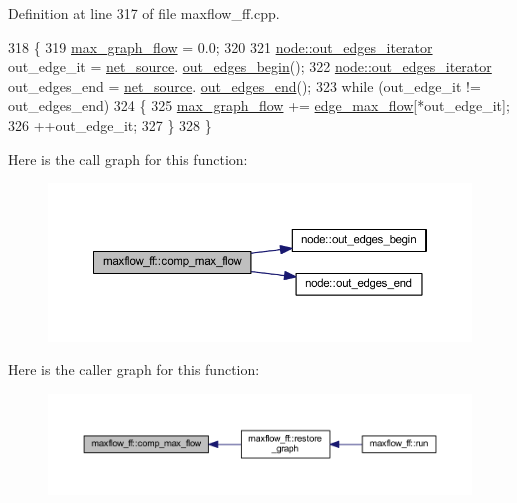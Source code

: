 Definition at line 317 of file maxflow\+\_\+ff.\+cpp.


\begin{DoxyCode}
318 \{
319     \mbox{\hyperlink{classmaxflow__ff_a7a2f530f9c95b6f37f4c349427a0f9bb}{max\_graph\_flow}} = 0.0;
320 
321     \mbox{\hyperlink{classnode_a90e17ed34de55072e8077f4367499a98}{node::out\_edges\_iterator}} out\_edge\_it = \mbox{\hyperlink{classmaxflow__ff_a2e4cc02ce8c9d929f2896525c686d6c1}{net\_source}}.
      \mbox{\hyperlink{classnode_a7dcb80df22118cea04f77ca8c952d9c2}{out\_edges\_begin}}();
322     \mbox{\hyperlink{classnode_a90e17ed34de55072e8077f4367499a98}{node::out\_edges\_iterator}} out\_edges\_end = \mbox{\hyperlink{classmaxflow__ff_a2e4cc02ce8c9d929f2896525c686d6c1}{net\_source}}.
      \mbox{\hyperlink{classnode_a7ce2ba5195a63d4df6b44299a02a9378}{out\_edges\_end}}();
323     \textcolor{keywordflow}{while} (out\_edge\_it != out\_edges\_end)
324     \{
325     \mbox{\hyperlink{classmaxflow__ff_a7a2f530f9c95b6f37f4c349427a0f9bb}{max\_graph\_flow}} += \mbox{\hyperlink{classmaxflow__ff_a669f36f1fae2dd0f6cfc0172e3ae0e8f}{edge\_max\_flow}}[*out\_edge\_it];
326     ++out\_edge\_it;
327     \}
328 \}
\end{DoxyCode}
Here is the call graph for this function\+:\nopagebreak
\begin{figure}[H]
\begin{center}
\leavevmode
\includegraphics[width=350pt]{classmaxflow__ff_a560d27c4c62b46dcb0a36ac60ebc1efb_cgraph}
\end{center}
\end{figure}
Here is the caller graph for this function\+:\nopagebreak
\begin{figure}[H]
\begin{center}
\leavevmode
\includegraphics[width=350pt]{classmaxflow__ff_a560d27c4c62b46dcb0a36ac60ebc1efb_icgraph}
\end{center}
\end{figure}
\mbox{\label{classmaxflow__ff_a22a432bb072e0410f20bb418dfd4d3a9}} 
